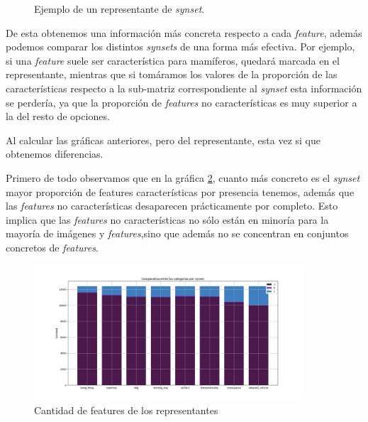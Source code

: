 \documentclass[12,twoside]{TFG-GM}
\theoremstyle{definition}
\theoremstyle{remark}
\begin{document}
\begin{figure}[H]
\begin{center}
\end{center}
\caption{Ejemplo de un representante de \textit{synset}.
\label{fig:representante}}
\end{figure}

De esta obtenemos una información más concreta respecto a cada \textit{feature}, además podemos comparar los distintos \textit{synsets} de una forma más efectiva. Por ejemplo, si una \textit{feature} suele ser característica para mamíferos, quedará marcada en el representante, mientras que si tomáramos los valores de la proporción de las características respecto a la sub-matriz correspondiente al \textit{synset} esta información se perdería, ya que la proporción de \textit{features} no características es muy superior a la del resto de opciones.

Al calcular las gráficas anteriores, pero del representante, esta vez si que obtenemos diferencias. 

Primero de todo observamos que en la gráfica \ref{fig:comparativaCategoriasporSynset}, cuanto más concreto es el \textit{synset} mayor proporción de features características por presencia tenemos, además que las \textit{features} no características desaparecen prácticamente por completo. Esto implica que las \textit{features} no características no sólo están en minoría para la mayoría de imágenes y \textit{features},sino que además no se concentran en conjuntos concretos de \textit{features}.   
\begin{figure}[ht] 
	\centering
	\includegraphics[width=0.9\textwidth] {Images/plots/25/synsetslayer/Comparative_of_synsets.png}
	\caption{ Cantidad de features de los representantes
	\label{fig:comparativaCategoriasporSynset}}
\end{figure}
\end{document}
